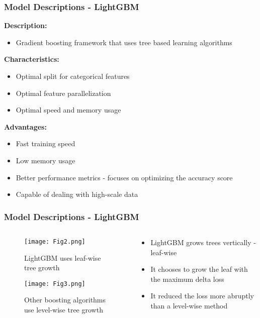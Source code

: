 \documentclass[10pt]{beamer}
\begin{document}
\begin{frame}
\frametitle{Model Descriptions - LightGBM}
\textbf{Description:}
\begin{itemize}
\item Gradient boosting framework that uses tree based learning algorithms
\end{itemize}
\textbf{Characteristics:}
\begin{itemize}
\item Optimal split for categorical features
\item Optimal feature parallelization 
\item Optimal speed and memory usage
\end{itemize}
\textbf{Advantages:}
\begin{itemize}
\item Fast training speed
\item Low memory usage
\item Better performance metrics - focuses on optimizing the accuracy score
\item Capable of dealing with high-scale data
\end{itemize}
\end{frame}

\begin{frame}
\frametitle{Model Descriptions - LightGBM}
\begin{columns}[T]
\begin{column}{6cm}
\begin{figure}
\centering
\texttt{[image: Fig2.png]}
\caption{LightGBM uses leaf-wise tree growth}
\end{figure}
\begin{figure}
\centering
\texttt{[image: Fig3.png]}
\caption{Other boosting algorithms use level-wise tree growth}
\end{figure}
\end{column}
\begin{column}{4cm}
\begin{itemize}
\item LightGBM grows trees vertically - leaf-wise 
\item It chooses to grow the leaf with the maximum delta loss
\item It reduced the loss more abruptly than a level-wise method
\end{itemize}
\end{column}
\end{columns}
\end{frame}
\end{document}
